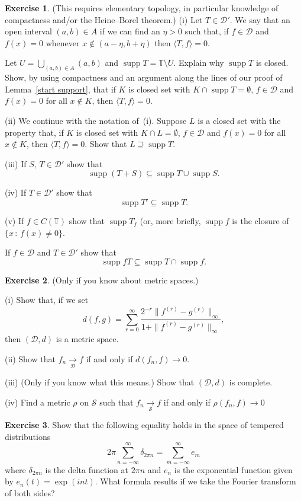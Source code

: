 \documentclass[12pt]{article}
\theoremstyle{definition}
\newtheorem{question}{Exercise}[section]
\newcommand{\supp}{\operatorname{supp}}
\newcommand{\arrowD}{\underset{\mathcal D}{\rightarrow}}
\newcommand{\arrowS}{\underset{\mathcal S}{\rightarrow}}
\begin{document}
\begin{question}\label{support} (This requires elementary topology,
in particular knowledge of compactness and/or the Heine--Borel
theorem.)
(i) Let $T\in{\mathcal D}'$. We say that an open interval
$(a,b)\in A$ if we can find an $\eta>0$ such that,
if $f\in{\mathcal D}$ and $f(x)=0$ whenever 
$x\notin(a-\eta,b+\eta)$ then $\langle T,f\rangle=0$.

Let $U=\bigcup_{(a,b)\in A}(a,b)$ and $\supp T={\mathbb T}\setminus U$.
Explain why $\supp T$ is closed.
Show, by using compactness and an argument along the lines
of our proof of Lemma~\ref{start support}, that
if $K$ is closed set with $K\cap\supp T=\emptyset$,
$f\in{\mathcal D}$ and $f(x)=0$ for all $x\notin K$,
then $\langle T,f\rangle=0$.

(ii) We continue with the notation of~(i).
Suppose $L$ is a closed set with the property
that, if $K$ is closed set with $K\cap L=\emptyset$,
$f\in{\mathcal D}$ and $f(x)=0$ for all $x\notin K$,
then $\langle T,f\rangle=0$. Show that $L\supseteq \supp T$.

(iii) If $S,\,T\in{\mathcal D}'$ show that
\[\supp(T+S)\subseteq \supp T \cup \supp S.\]

(iv) If $T\in{\mathcal D}'$ show that
\[\supp T'\subseteq \supp T.\]

(v) If $f\in C({\mathbb T})$ show that
$\supp T_{f}$ (or, more briefly, $\supp f$
is the closure of $\{x\,:\,f(x)\neq 0\}$.

If $f\in{\mathcal D}$ and $T\in{\mathcal D}'$ show that
\[\supp fT\subseteq \supp T\cap  \supp f.\]
\end{question}
\begin{question} (Only if you know about metric spaces.)

(i) Show that, if we set
\[d(f,g)=\sum_{r=0}^{\infty}
\frac{2^{-r}\|f^{(r)}-g^{(r)}\|_{\infty}}{1+\|f^{(r)}-g^{(r)}\|_{\infty}},\]
then $({\mathcal D},d)$ is a metric space.

(ii) Show that $f_{n}\arrowD f$ if and only if $d(f_{n},f)\rightarrow 0$.

(iii) (Only if you know what this means.)
Show that $({\mathcal D},d)$ is complete.

(iv) Find a metric $\rho$ on ${\mathcal S}$ such that
$f_{n}\arrowS f$ if and only if $\rho(f_{n},f)\rightarrow 0$

\end{question}
\begin{question} Show that the following equality holds
in the space of tempered distributions
\[2\pi\sum_{n=-\infty}^{\infty}\delta_{2\pi n}
=\sum_{m=-\infty}^{\infty}e_{m}\]
where $\delta_{2\pi n}$ is the delta function at $2\pi n$ and $e_{n}$
is the exponential function given by $e_{n}(t)=\exp(int)$.
What formula results if we take the Fourier transform
of both sides?
\end{question}
\end{document}
